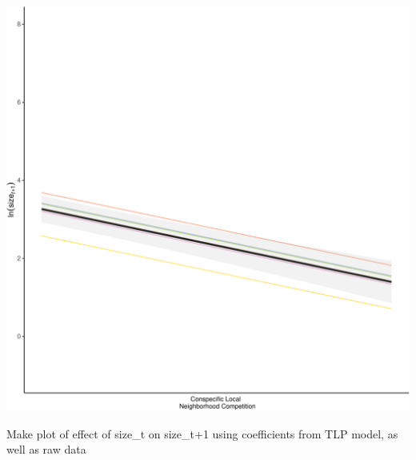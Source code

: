 \documentclass[
]{article}
\begin{document}
\includegraphics{figures/unnamed-chunk-9-1.pdf}

Make plot of effect of size\_t on size\_t+1 using coefficients from TLP
model, as well as raw data
\end{document}
